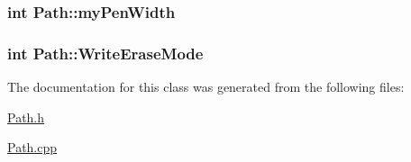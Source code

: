 \label{classPath_aa4957231df4c43c1dff18df7caa4f0d8}
\hypertarget{classPath_aaa655eaed9bc76b4be7a83e798cafdc4}{
\subsubsection[{myPenWidth}]{\setlength{\rightskip}{0pt plus 5cm}int {\bf Path::myPenWidth}}}
\label{classPath_aaa655eaed9bc76b4be7a83e798cafdc4}
\hypertarget{classPath_ae2d6268c79888176aece5b76350810a2}{
\subsubsection[{WriteEraseMode}]{\setlength{\rightskip}{0pt plus 5cm}int {\bf Path::WriteEraseMode}}}
\label{classPath_ae2d6268c79888176aece5b76350810a2}


The documentation for this class was generated from the following files:\begin{DoxyCompactItemize}
\item 
\hyperlink{Path_8h}{Path.h}\item 
\hyperlink{Path_8cpp}{Path.cpp}\end{DoxyCompactItemize}
